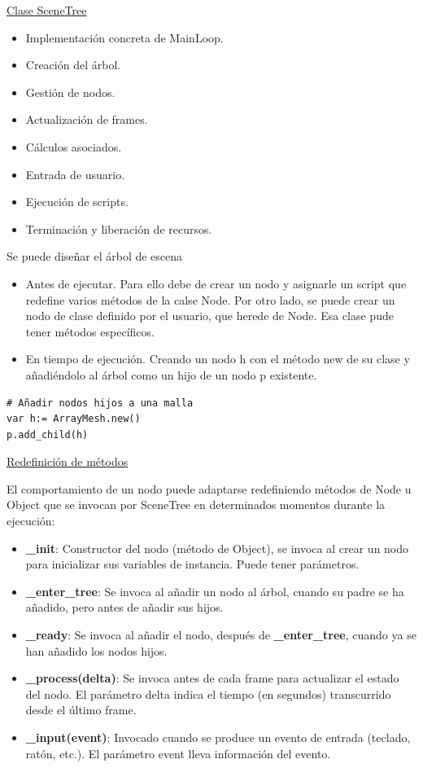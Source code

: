 \documentclass[12pt]{report} %
\providecommand{\tightlist}{%
  \setlength{\itemsep}{0pt}\setlength{\parskip}{0pt}}
\begin{document}
\underline{Clase SceneTree}

\begin{itemize}
\tightlist
\item
  Implementación concreta de MainLoop.
\item
  Creación del árbol.
\item
  Gestión de nodos.
\item
  Actualización de frames.
\item
  Cálculos asociados.
\item
  Entrada de usuario.
\item
  Ejecución de scripts.
\item
  Terminación y liberación de recursos.
\end{itemize}

Se puede diseñar el árbol de escena

\begin{itemize}
\tightlist
\item
  Antes de ejecutar. Para ello debe de crear un nodo y asignarle un
  script que redefine varios métodos de la calse Node. Por otro lado, se
  puede crear un nodo de clase definido por el usuario, que herede de
  Node. Esa clase pude tener métodos específicos.
\item
  En tiempo de ejecución. Creando un nodo h con el método new de su
  clase y añadiéndolo al árbol como un hijo de un nodo p existente.
\end{itemize}

\begin{lstlisting}
# Añadir nodos hijos a una malla
var h:= ArrayMesh.new()
p.add_child(h)
\end{lstlisting}

\underline{Redefinición de métodos}

El comportamiento de un nodo puede adaptarse redefiniendo métodos de
Node u Object que se invocan por SceneTree en determinados momentos
durante la ejecución:

\begin{itemize}
\tightlist
\item
  \textbf{\_init}: Constructor del nodo (método de Object), se invoca al
  crear un nodo para inicializar sus variables de instancia. Puede tener
  parámetros.
\item
  \textbf{\_enter\_tree}: Se invoca al añadir un nodo al árbol, cuando
  su padre se ha añadido, pero antes de añadir sus hijos.
\item
  \textbf{\_ready}: Se invoca al añadir el nodo, después de
  \textbf{\_enter\_tree}, cuando ya se han añadido los nodos hijos.
\item
  \textbf{\_process(delta)}: Se invoca antes de cada frame para
  actualizar el estado del nodo. El parámetro delta indica el tiempo (en
  segundos) transcurrido desde el último frame.
\item
  \textbf{\_input(event)}: Invocado cuando se produce un evento de
  entrada (teclado, ratón, etc.). El parámetro event lleva información
  del evento.
\end{itemize}
\end{document}

